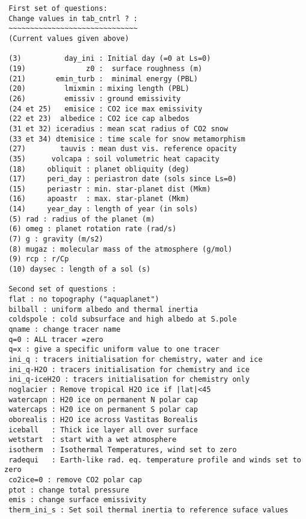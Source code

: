 {\footnotesize
\begin{verbatim}
 First set of questions:
 Change values in tab_cntrl ? :
 ~~~~~~~~~~~~~~~~~~~~~~~~~~~~~~
 (Current values given above)

 (3)          day_ini : Initial day (=0 at Ls=0)
 (19)              z0 :  surface roughness (m)
 (21)       emin_turb :  minimal energy (PBL)
 (20)         lmixmin : mixing length (PBL)
 (26)         emissiv : ground emissivity
 (24 et 25)   emisice : CO2 ice max emissivity
 (22 et 23)  albedice : CO2 ice cap albedos
 (31 et 32) iceradius : mean scat radius of CO2 snow
 (33 et 34) dtemisice : time scale for snow metamorphism
 (27)        tauvis : mean dust vis. reference opacity
 (35)      volcapa : soil volumetric heat capacity
 (18)     obliquit : planet obliquity (deg)
 (17)     peri_day : periastron date (sols since Ls=0)
 (15)     periastr : min. star-planet dist (Mkm)
 (16)     apoastr  : max. star-planet (Mkm)
 (14)     year_day : length of year (in sols)
 (5) rad : radius of the planet (m)
 (6) omeg : planet rotation rate (rad/s)
 (7) g : gravity (m/s2)
 (8) mugaz : molecular mass of the atmosphere (g/mol)
 (9) rcp : r/Cp
 (10) daysec : length of a sol (s)

 Second set of questions :
 flat : no topography ("aquaplanet")
 bilball : uniform albedo and thermal inertia
 coldspole : cold subsurface and high albedo at S.pole
 qname : change tracer name
 q=0 : ALL tracer =zero
 q=x : give a specific uniform value to one tracer
 ini_q : tracers initialisation for chemistry, water and ice
 ini_q-H2O : tracers initialisation for chemistry and ice
 ini_q-iceH2O : tracers initialisation for chemistry only
 noglacier : Remove tropical H2O ice if |lat|<45
 watercapn : H20 ice on permanent N polar cap
 watercaps : H20 ice on permanent S polar cap
 oborealis : H2O ice across Vastitas Borealis
 iceball   : Thick ice layer all over surface
 wetstart  : start with a wet atmosphere
 isotherm  : Isothermal Temperatures, wind set to zero
 radequi   : Earth-like rad. eq. temperature profile and winds set to zero
 co2ice=0 : remove CO2 polar cap
 ptot : change total pressure
 emis : change surface emissivity
 therm_ini_s : Set soil thermal inertia to reference suface values
\end{verbatim}
}
